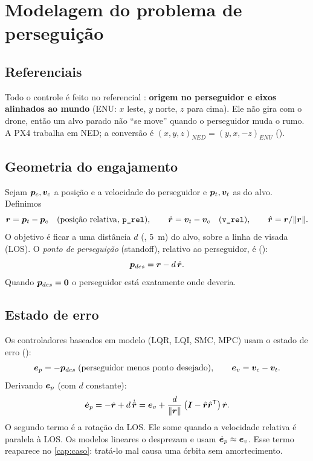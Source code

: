 \chapter{Modelagem do problema de perseguição}
\label{cap:modelagem}

\section{Referenciais}
Todo o controle é feito no referencial : \textbf{origem no
perseguidor e eixos alinhados ao mundo} (ENU: $x$ leste, $y$ norte, $z$ para cima). Ele
não gira com o drone, então um alvo parado não ``se move'' quando o perseguidor muda o
rumo. A PX4 trabalha em NED; a conversão é $(x,y,z)_{NED} = (y,x,-z)_{ENU}$
().

\section{Geometria do engajamento}
Sejam $\bm{p}_c, \bm{v}_c$ a posição e a velocidade do perseguidor e
$\bm{p}_t, \bm{v}_t$ as do alvo. Definimos
\begin{equation}
  \bm{r} = \bm{p}_t - \bm{p}_c \quad\text{(posição relativa, \texttt{p\_rel})},\qquad
  \dot{\bm{r}} = \bm{v}_t - \bm{v}_c \quad\text{(\texttt{v\_rel})},\qquad
  \hat{\bm{r}} = \bm{r}/\lVert\bm{r}\rVert .
\end{equation}
O objetivo é ficar a uma distância $d$ (, \SI{5}{m}) do alvo,
sobre a linha de visada (LOS). O \emph{ponto de perseguição} (standoff), relativo ao
perseguidor, é ():
\begin{equation}
  \bm{p}_{des} = \bm{r} - d\,\hat{\bm{r}} .
\end{equation}
Quando $\bm{p}_{des}=\bm{0}$ o perseguidor está exatamente onde deveria.

\section{Estado de erro}
Os controladores baseados em modelo (LQR, LQI, SMC, MPC) usam o estado de erro
():
\begin{equation}
  \bm{e}_p = -\bm{p}_{des} \;(\text{perseguidor menos ponto desejado}),\qquad
  \bm{e}_v = \bm{v}_c - \bm{v}_t .
  \label{eq:erro}
\end{equation}
Derivando $\bm{e}_p$ (com $d$ constante):
\begin{equation}
  \dot{\bm{e}}_p = -\dot{\bm{r}} + d\,\dot{\hat{\bm{r}}}
  = \bm{e}_v + \frac{d}{\lVert\bm{r}\rVert}\left(\bm{I} - \hat{\bm{r}}\hat{\bm{r}}^{\mathsf{T}}\right)\dot{\bm{r}} .
  \label{eq:dep}
\end{equation}
O segundo termo é a rotação da LOS. Ele some quando a velocidade relativa é paralela à
LOS. Os modelos lineares o desprezam e usam $\dot{\bm{e}}_p \approx \bm{e}_v$. Esse termo
reaparece no \cref{cap:caso}: tratá-lo mal causa uma órbita sem amortecimento.

